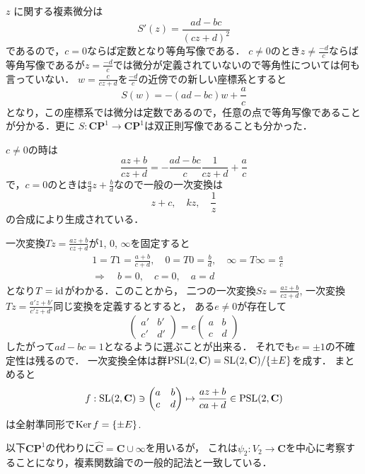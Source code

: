 $z$ に関する複素微分は
\[
	S'(z)=\frac{ad-bc}{(c z +d)^2}
\]
であるので，$c=0$ならば定数となり等角写像である．
$c\neq0$のとき$z\neq \frac{-d}{c}$ならば等角写像であるが$z=\frac{-d}{c}$では微分が定義されていないので等角性については何も言っていない．
$w=\frac{c}{cz+d}$を$\frac{-d}{c}$の近傍での新しい座標系とすると
\[
	S(w)=-(ad-bc)w+\frac{a}{c}
\]
となり，この座標系では微分は定数であるので，任意の点で等角写像であることが分かる．更に
$S:\mathbf C\mathbf P^1\to\mathbf C\mathbf P^1$は双正則写像であることも分かった．

$c\neq0$の時は
\[
	\frac{a z +b}{c z +d} 
	=- \frac{ad-bc}{c}\frac{1}{c z +d}  +  \frac{a}{c}
\]
で，$c=0$のときは$\frac{a}{d} z +\frac{b}{d}$なので一般の一次変換は
\[
	z + c,\quad kz,\quad  \frac{1}{z}
\]
の合成により生成されている．

一次変換$Tz= \frac{a z +b}{c z +d}$が$1$, $0$, $\infty$を固定すると
\[
\begin{split}
	&1=T1= \frac{a +b}{c +d},\quad 0=T0=\frac{b}{d},\quad 
	\infty=T\infty=\frac{a}{c}\\
	&\Rightarrow \quad
	b=0,\quad c=0, \quad a=d
\end{split}
\]
となり$T=\operatorname{id}$がわかる．このことから，
二つの一次変換$Sz= \frac{a z +b}{c z +d}$,
一次変換$Tz= \frac{a' z +b'}{c' z +d'}$同じ変換を定義するとすると，
ある$e\neq 0$が存在して
\[
	\begin{pmatrix}
		a' & b'\\
		c' & d'
	\end{pmatrix}
	=e
	\begin{pmatrix}
		a & b\\
		c & d
	\end{pmatrix}
\]
したがって$ad-bc=1$となるように選ぶことが出来る．
それでも$e=\pm 1$の不確定性は残るので．
一次変換全体は群$\operatorname{PSL}(2,\mathbf C)= \operatorname{SL}(2,\mathbf C)/\{\pm E\}$を成す．
まとめると
\[
   f:
   \operatorname{SL}(2,\mathbf C)
   \ni \begin{pmatrix}
      a & b\\
      c & d
   \end{pmatrix}
   \mapsto
   \frac{az+b}{ca+d}
   \in \operatorname{PSL}(2,\mathbf C)
\]
は全射準同形で$\operatorname{Ker} f=\{\pm E\}$.

以下$\mathbf C\mathbf P^1$の代わりに$\hat{\mathbf C}= \mathbf C\cup \infty$を用いるが，
これは$\psi_2:V_2\to \mathbf C$を中心に考察することになり，複素関数論での一般的記法と一致している．

